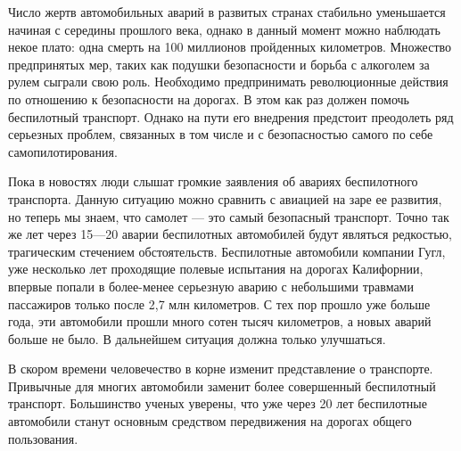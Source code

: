 

Число жертв автомобильных аварий в развитых странах стабильно уменьшается 
начиная с середины прошлого века, однако в данный момент можно наблюдать
некое плато: одна смерть на 100 
миллионов пройденных километров. Множество предпринятых мер, таких как подушки
безопасности и борьба с алкоголем за рулем сыграли свою роль. Необходимо 
предпринимать революционные действия по отношению к безопасности на дорогах.
В этом как раз должен помочь беспилотный транспорт. Однако на пути его 
внедрения предстоит преодолеть ряд серьезных проблем, связанных в том числе и
с безопасностью самого по себе самопилотирования.

Пока в новостях люди слышат громкие заявления об авариях беспилотного транспорта.
Данную ситуацию можно сравнить с авиацией на заре 
ее развития, но теперь мы знаем, что самолет — это самый безопасный транспорт. 
Точно так же лет через 15—20 аварии беспилотных автомобилей будут являться
редкостью, трагическим стечением обстоятельств.
Беспилотные автомобили компании Гугл, уже 
несколько лет проходящие полевые испытания на дорогах Калифорнии, впервые попали 
в более-менее серьезную аварию с небольшими травмами пассажиров только после 2,7 
млн километров. С тех пор прошло уже больше года, эти автомобили прошли 
много сотен тысяч километров, а новых аварий больше не было. В дальнейшем
ситуация должна только улучшаться.

В скором времени человечество в корне изменит представление о транспорте.
Привычные для многих автомобили заменит более совершенный беспилотный транспорт. 
Большинство ученых уверены, что уже через 20 лет беспилотные автомобили
станут основным средством передвижения на дорогах общего пользования.


